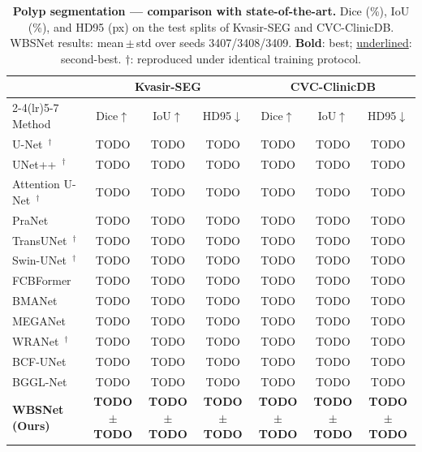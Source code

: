 \documentclass[journal]{IEEEtran}
\begin{document}
\begin{table}[t]
  \centering
  \caption{\textbf{Polyp segmentation --- comparison with state-of-the-art.}
    Dice (\%), IoU (\%), and HD95 (px) on the test splits of Kvasir-SEG and
    CVC-ClinicDB.  WBSNet results: mean\,$\pm$\,std over seeds
    3407/3408/3409.  \textbf{Bold}: best; \underline{underlined}: second-best.
    $\dagger$: reproduced under identical training protocol.}
  \label{tab:sota_polyp}
  \setlength{\tabcolsep}{5pt}
  \begin{tabular}{@{}lcccccc@{}}
    \toprule
    & \multicolumn{3}{c}{Kvasir-SEG} & \multicolumn{3}{c}{CVC-ClinicDB} \\
    \cmidrule(lr){2-4}\cmidrule(lr){5-7}
    Method
      & Dice$\uparrow$ & IoU$\uparrow$ & HD95$\downarrow$
      & Dice$\uparrow$ & IoU$\uparrow$ & HD95$\downarrow$ \\
    \midrule
    U-Net~\cite{ronneberger2015unet}$^{\dagger}$
        & TODO & TODO & TODO & TODO & TODO & TODO \\
    UNet++~\cite{zhou2019unetpp}$^{\dagger}$
        & TODO & TODO & TODO & TODO & TODO & TODO \\
    Attention U-Net~\cite{oktay2018attnunet}$^{\dagger}$
        & TODO & TODO & TODO & TODO & TODO & TODO \\
    PraNet~\cite{fan2020pranet}
        & TODO & TODO & TODO & TODO & TODO & TODO \\
    TransUNet~\cite{chen2021transunet}$^{\dagger}$
        & TODO & TODO & TODO & TODO & TODO & TODO \\
    Swin-UNet~\cite{cao2021swinunet}$^{\dagger}$
        & TODO & TODO & TODO & TODO & TODO & TODO \\
    FCBFormer~\cite{fcbformer2022}
        & TODO & TODO & TODO & TODO & TODO & TODO \\
    BMANet~\cite{bmanet2025}
        & TODO & TODO & TODO & TODO & TODO & TODO \\
    MEGANet~\cite{meganet2024}
        & TODO & TODO & TODO & TODO & TODO & TODO \\
    WRANet~\cite{wang2023wranet}$^{\dagger}$
        & TODO & TODO & TODO & TODO & TODO & TODO \\
    BCF-UNet~\cite{bcfunet2024}
        & TODO & TODO & TODO & TODO & TODO & TODO \\
    BGGL-Net~\cite{bgglnet2025}
        & TODO & TODO & TODO & TODO & TODO & TODO \\
    \midrule
    \textbf{WBSNet (Ours)}
        & \textbf{TODO$\pm$TODO} & \textbf{TODO$\pm$TODO}
        & \textbf{TODO$\pm$TODO}
        & \textbf{TODO$\pm$TODO} & \textbf{TODO$\pm$TODO}
        & \textbf{TODO$\pm$TODO} \\
    \bottomrule
  \end{tabular}
\end{table}
\end{document}
